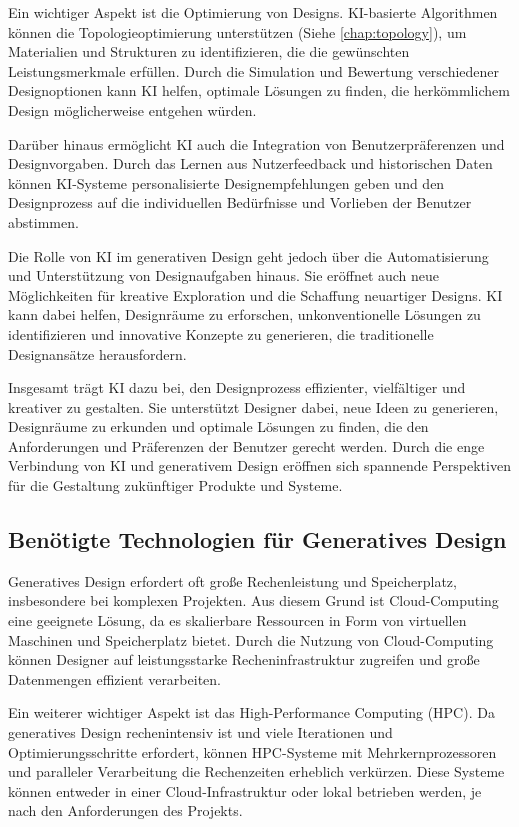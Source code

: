 Ein wichtiger Aspekt ist die Optimierung von Designs. KI-basierte Algorithmen können die Topologieoptimierung unterstützen (Siehe \autoref{chap:topology}), um Materialien und Strukturen zu identifizieren, die die gewünschten Leistungsmerkmale erfüllen. Durch die Simulation und Bewertung verschiedener Designoptionen kann KI helfen, optimale Lösungen zu finden, die herkömmlichem Design möglicherweise entgehen würden.

Darüber hinaus ermöglicht KI auch die Integration von Benutzerpräferenzen und Designvorgaben. Durch das Lernen aus Nutzerfeedback und historischen Daten können KI-Systeme personalisierte Designempfehlungen geben und den Designprozess auf die individuellen Bedürfnisse und Vorlieben der Benutzer abstimmen.

Die Rolle von KI im generativen Design geht jedoch über die Automatisierung und Unterstützung von Designaufgaben hinaus. Sie eröffnet auch neue Möglichkeiten für kreative Exploration und die Schaffung neuartiger Designs. KI kann dabei helfen, Designräume zu erforschen, unkonventionelle Lösungen zu identifizieren und innovative Konzepte zu generieren, die traditionelle Designansätze herausfordern.

Insgesamt trägt KI dazu bei, den Designprozess effizienter, vielfältiger und kreativer zu gestalten. Sie unterstützt Designer dabei, neue Ideen zu generieren, Designräume zu erkunden und optimale Lösungen zu finden, die den Anforderungen und Präferenzen der Benutzer gerecht werden. Durch die enge Verbindung von KI und generativem Design eröffnen sich spannende Perspektiven für die Gestaltung zukünftiger Produkte und Systeme. \autocite*{21} \autocite*{22}

\subsection*{Benötigte Technologien für Generatives Design}
Generatives Design erfordert oft große Rechenleistung und Speicherplatz, insbesondere bei komplexen Projekten. Aus diesem Grund ist Cloud-Computing eine geeignete Lösung, da es skalierbare Ressourcen in Form von virtuellen Maschinen und Speicherplatz bietet. Durch die Nutzung von Cloud-Computing können Designer auf leistungsstarke Recheninfrastruktur zugreifen und große Datenmengen effizient verarbeiten.

Ein weiterer wichtiger Aspekt ist das High-Performance Computing (HPC). Da generatives Design rechenintensiv ist und viele Iterationen und Optimierungsschritte erfordert, können HPC-Systeme mit Mehrkernprozessoren und paralleler Verarbeitung die Rechenzeiten erheblich verkürzen. Diese Systeme können entweder in einer Cloud-Infrastruktur oder lokal betrieben werden, je nach den Anforderungen des Projekts.

